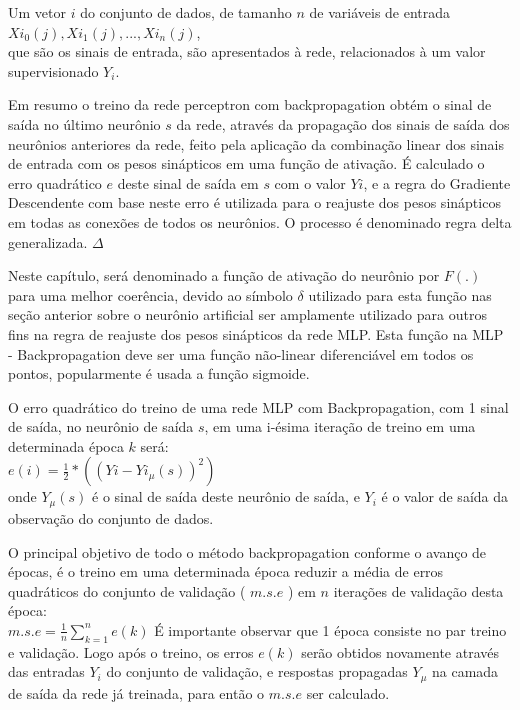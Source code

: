 \documentclass[	12pt, Times, openright, twoside, a4paper, english, brazil]{abntex2}
\begin{document}
            Um vetor $i$ do conjunto de dados, de tamanho $n$ de variáveis de entrada\\ $Xi_{0}(j),Xi_{1}(j),...,Xi_{n}(j)$,\\ que são os sinais de entrada, são apresentados à rede, relacionados à um valor supervisionado $Y_i$.
            
            Em resumo o treino da rede perceptron com backpropagation obtém o sinal de saída no último neurônio $s$ da rede, através da propagação dos sinais de saída dos neurônios anteriores da rede, feito pela aplicação da combinação linear dos sinais de entrada com os pesos sinápticos em uma função de ativação. É calculado o erro quadrático $e$ deste sinal de saída em $s$ com o valor $Yi$, e a regra do Gradiente Descendente com base neste erro é utilizada para o reajuste dos pesos sinápticos em todas as conexões de todos os neurônios. O processo é denominado regra delta generalizada. $\Delta$
            
            Neste capítulo, será denominado a função de ativação do neurônio por $F(.)$ para uma melhor coerência, devido ao símbolo $\delta$ utilizado para esta função nas seção anterior sobre o neurônio artificial ser amplamente utilizado para outros fins na regra de reajuste dos pesos sinápticos da rede MLP. Esta função na MLP - Backpropagation deve ser uma função não-linear diferenciável em todos os pontos, popularmente é usada a função sigmoide.
            
            O erro quadrático do treino de uma rede MLP com Backpropagation, com 1 sinal de saída, no neurônio de saída $s$, em uma i-ésima iteração de treino em uma determinada época $k$ será:\\ 
            $ e(i) =\frac{1}{2}*( (Yi-Yi_{\mu}(s))^2 ) $\\ onde $Y_{\mu}(s)$ é o sinal de saída deste neurônio de saída, e $Y_i$ é o valor de saída da observação do conjunto de dados.
            
            O principal objetivo de todo o método backpropagation conforme o avanço de épocas, é o treino em uma determinada época reduzir a média de erros quadráticos do conjunto de validação ( $m.s.e$ ) em $n$ iterações de validação desta época:\\
            $m.s.e = \frac{1}{n} \sum_{k=1}^{n}e(k)$
            É importante observar que 1 época consiste no par treino e validação. Logo após o treino, os erros $e(k)$ serão obtidos novamente através das entradas $Y_i$ do conjunto de validação, e respostas propagadas $Y_\mu$ na camada de saída da rede já treinada, para então o $m.s.e$ ser calculado.
            
\end{document}
